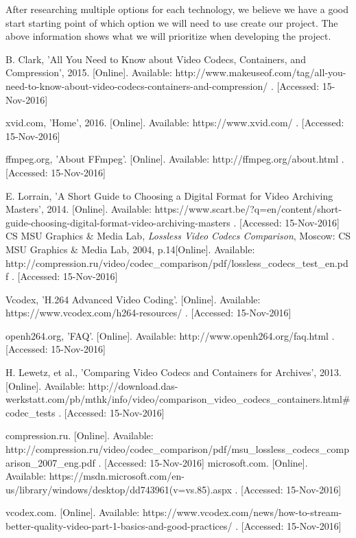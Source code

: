 \documentclass[letterpaper,10pt,onecolumn,draftclsnofoot]{IEEEtran}
\begin{document}
After researching multiple options for each technology, we believe we have a good start starting point of which option we will need to use create our project.
The above information shows what we will prioritize when developing the project.

\newpage
\begin{thebibliography}{99}
B. Clark, 'All You Need to Know about Video Codecs, Containers, and Compression', 2015. [Online]. Available: http://www.makeuseof.com/tag/all-you-need-to-know-about-video-codecs-containers-and-compression/ . [Accessed: 15-Nov-2016]

xvid.com, 'Home', 2016. [Online]. Available: https://www.xvid.com/ . [Accessed: 15-Nov-2016]

ffmpeg.org, 'About FFmpeg'. [Online]. Available: http://ffmpeg.org/about.html . [Accessed: 15-Nov-2016]

E. Lorrain, 'A Short Guide to Choosing a Digital Format for Video Archiving Masters', 2014. [Online]. Available: https://www.scart.be/?q=en/content/short-guide-choosing-digital-format-video-archiving-masters . [Accessed: 15-Nov-2016]
CS MSU Graphics \& Media Lab, \textit{Lossless Video Codecs Comparison}, Moscow: CS MSU Graphics \& Media Lab, 2004, p.14[Online]. Available: http://compression.ru/video/codec\_comparison/pdf/lossless\_codecs\_test\_en.pdf . [Accessed: 15-Nov-2016]

Vcodex, 'H.264 Advanced Video Coding'. [Online]. Available: https://www.vcodex.com/h264-resources/ . [Accessed: 15-Nov-2016]

openh264.org, 'FAQ'. [Online]. Available: http://www.openh264.org/faq.html . [Accessed: 15-Nov-2016]

H. Lewetz, et al., 'Comparing Video Codecs and Containers for Archives', 2013. [Online]. Available: http://download.das-werkstatt.com/pb/mthk/info/video/comparison\_video\_codecs\_containers.html\#codec\_tests . [Accessed: 15-Nov-2016]

compression.ru. [Online]. Available: http://compression.ru/video/codec\_comparison/pdf/msu\_lossless\_codecs\_comparison\_2007\_eng.pdf . [Accessed: 15-Nov-2016]
microsoft.com. [Online]. Available: https://msdn.microsoft.com/en-us/library/windows/desktop/dd743961(v=vs.85).aspx . [Accessed: 15-Nov-2016]

vcodex.com. [Online]. Available: https://www.vcodex.com/news/how-to-stream-better-quality-video-part-1-basics-and-good-practices/ . [Accessed: 15-Nov-2016]


\end{thebibliography}
\end{document}
